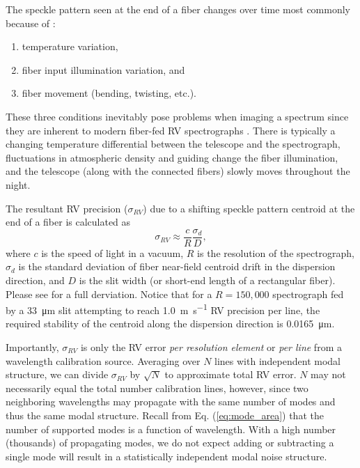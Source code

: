 \documentclass[11pt]{article}
\begin{document}
The speckle pattern seen at the end of a fiber changes over time most commonly because of \citep{Epworth1978}:
\begin{enumerate}
\item temperature variation,
\item fiber input illumination variation, and
\item fiber movement (bending, twisting, etc.).
\end{enumerate}
These three conditions inevitably pose problems when imaging a spectrum since they are inherent to modern fiber-fed RV spectrographs \citep{Baudrand2001, Mahadevan2014}. There is typically a changing temperature differential between the telescope and the spectrograph, fluctuations in atmospheric density and guiding change the fiber illumination, and the telescope (along with the connected fibers) slowly moves throughout the night.

The resultant RV precision ($\sigma_{RV}$) due to a shifting speckle pattern centroid at the end of a fiber is calculated as
\begin{equation}
\sigma_{RV} \approx \frac{c}{R} \frac{\sigma_d}{D},
\label{eq:rv_error}
\end{equation}
where $c$ is the speed of light in a vacuum, $R$ is the resolution of the spectrograph, $\sigma_d$ is the standard deviation of fiber near-field centroid drift in the dispersion direction, and $D$ is the slit width (or short-end length of a rectangular fiber). Please see \citet{Petersburg2018} for a full derviation. Notice that for a $R=150,000$ spectrograph fed by a \SI{33}{\micro\meter} slit attempting to reach \SI{1.0}{\meter\per\second} RV precision per line, the required stability of the centroid along the dispersion direction is \SI{0.0165}{\micro\meter}.

Importantly, $\sigma_{RV}$ is only the RV error \textit{per resolution element} or \textit{per line} from a wavelength calibration source. Averaging over $N$ lines with independent modal structure, we can divide $\sigma_{RV}$ by $\sqrt{N}$ to approximate total RV error. $N$ may not necessarily equal the total number calibration lines, however, since two neighboring wavelengths may propagate with the same number of modes and thus the same modal structure. Recall from Eq. (\ref{eq:mode_area}) that the number of supported modes is a function of wavelength. With a high number (thousands) of propagating modes, we do not expect adding or subtracting a single mode will result in a statistically independent modal noise structure.
\end{document}
